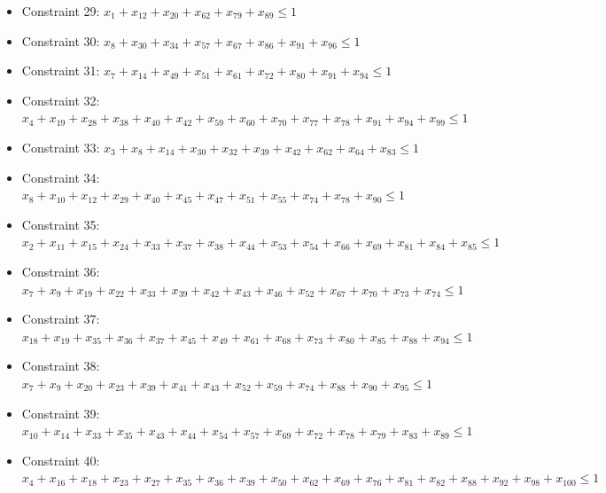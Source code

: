 \documentclass[11pt]{article}
\begin{document}
\begin{itemize}
\item Constraint 29: $x_{1} + x_{12} + x_{20} + x_{62} + x_{79} + x_{89} \le 1$
\item Constraint 30: $x_{8} + x_{30} + x_{34} + x_{57} + x_{67} + x_{86} + x_{91} + x_{96} \le 1$
\item Constraint 31: $x_{7} + x_{14} + x_{49} + x_{51} + x_{61} + x_{72} + x_{80} + x_{91} + x_{94} \le 1$
\item Constraint 32: $x_{4} + x_{19} + x_{28} + x_{38} + x_{40} + x_{42} + x_{59} + x_{60} + x_{70} + x_{77} + x_{78} + x_{91} + x_{94} + x_{99} \le 1$
\item Constraint 33: $x_{3} + x_{8} + x_{14} + x_{30} + x_{32} + x_{39} + x_{42} + x_{62} + x_{64} + x_{83} \le 1$
\item Constraint 34: $x_{8} + x_{10} + x_{12} + x_{29} + x_{40} + x_{45} + x_{47} + x_{51} + x_{55} + x_{74} + x_{78} + x_{90} \le 1$
\item Constraint 35: $x_{2} + x_{11} + x_{15} + x_{24} + x_{33} + x_{37} + x_{38} + x_{44} + x_{53} + x_{54} + x_{66} + x_{69} + x_{81} + x_{84} + x_{85} \le 1$
\item Constraint 36: $x_{7} + x_{9} + x_{19} + x_{22} + x_{33} + x_{39} + x_{42} + x_{43} + x_{46} + x_{52} + x_{67} + x_{70} + x_{73} + x_{74} \le 1$
\item Constraint 37: $x_{18} + x_{19} + x_{35} + x_{36} + x_{37} + x_{45} + x_{49} + x_{61} + x_{68} + x_{73} + x_{80} + x_{85} + x_{88} + x_{94} \le 1$
\item Constraint 38: $x_{7} + x_{9} + x_{20} + x_{23} + x_{39} + x_{41} + x_{43} + x_{52} + x_{59} + x_{74} + x_{88} + x_{90} + x_{95} \le 1$
\item Constraint 39: $x_{10} + x_{14} + x_{33} + x_{35} + x_{43} + x_{44} + x_{54} + x_{57} + x_{69} + x_{72} + x_{78} + x_{79} + x_{83} + x_{89} \le 1$
\item Constraint 40: $x_{4} + x_{16} + x_{18} + x_{23} + x_{27} + x_{35} + x_{36} + x_{39} + x_{50} + x_{62} + x_{69} + x_{76} + x_{81} + x_{82} + x_{88} + x_{92} + x_{98} + x_{100} \le 1$
\end{itemize}
\end{document}
